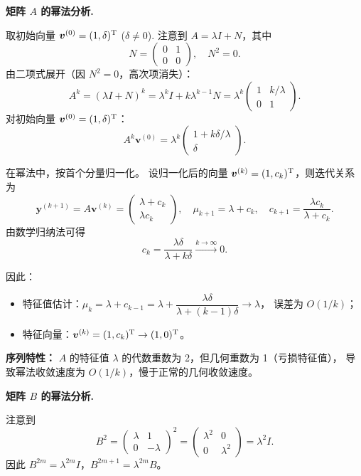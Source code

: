 \documentclass{article}
\begin{document}
\begin{solution}

  \textbf{矩阵 $A$ 的幂法分析.}

  取初始向量 $\boldsymbol{v}^{(0)} = (1, \delta)^{\mathrm{T}}$ ($\delta \neq 0$).
  注意到 $A = \lambda I + N$，其中
  \[
    N =
    \begin{pmatrix} 0 & 1 \\ 0 & 0
    \end{pmatrix}, \quad N^2 = 0.
  \]
  由二项式展开（因 $N^2 = 0$，高次项消失）：
  \[
    A^k = (\lambda I + N)^k = \lambda^k I + k\lambda^{k-1}N
    = \lambda^k
    \begin{pmatrix} 1 & k/\lambda \\ 0 & 1
    \end{pmatrix}.
  \]
  对初始向量 $\boldsymbol{v}^{(0)} = (1, \delta)^{\mathrm{T}}$：
  \[
    A^k \boldsymbol{v}^{(0)} = \lambda^k
    \begin{pmatrix} 1 + k\delta/\lambda \\ \delta
    \end{pmatrix}.
  \]

  在幂法中，按首个分量归一化。
  设归一化后的向量 $\boldsymbol{v}^{(k)} = (1, c_k)^{\mathrm{T}}$，则迭代关系为
  \[
    \boldsymbol{y}^{(k+1)} = A\boldsymbol{v}^{(k)}
    =
    \begin{pmatrix} \lambda + c_k \\ \lambda c_k
    \end{pmatrix},
    \quad \mu_{k+1} = \lambda + c_k,
    \quad c_{k+1} = \frac{\lambda c_k}{\lambda + c_k}.
  \]
  由数学归纳法可得
  \[
    c_k = \frac{\lambda\delta}{\lambda + k\delta} \xrightarrow{k\to\infty} 0.
  \]

  因此：
  \begin{itemize}
    \item 特征值估计：$\mu_k = \lambda + c_{k-1} = \lambda +
      \dfrac{\lambda\delta}{\lambda + (k-1)\delta} \to \lambda$，
      误差为 $O(1/k)$；
    \item 特征向量：$\boldsymbol{v}^{(k)} = (1, c_k)^{\mathrm{T}} \to (1, 0)^{\mathrm{T}}$。
  \end{itemize}

  \textbf{序列特性：}
  $A$ 的特征值 $\lambda$ 的代数重数为 2，但几何重数为 1（亏损特征值），
  导致幂法收敛速度为 $O(1/k)$，慢于正常的几何收敛速度。

  \medskip

  \textbf{矩阵 $B$ 的幂法分析.}

  注意到
  \[
    B^2 =
    \begin{pmatrix} \lambda & 1 \\ 0 & -\lambda
    \end{pmatrix}^2
    =
    \begin{pmatrix} \lambda^2 & 0 \\ 0 & \lambda^2
    \end{pmatrix}
    = \lambda^2 I.
  \]
  因此 $B^{2m} = \lambda^{2m}I$，$B^{2m+1} = \lambda^{2m}B$。


\end{solution}
\end{document}
